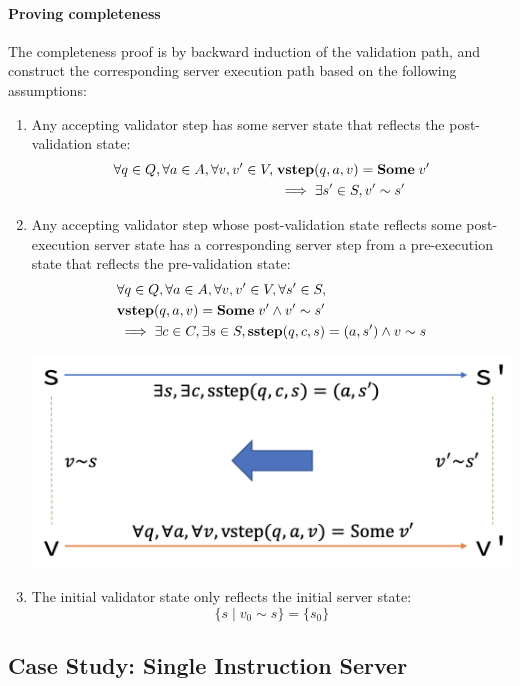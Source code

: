 \documentclass{article}
\theoremstyle{definition}
\newcommand{\sstep}{\ottkw{sstep}}
\newcommand{\vstep}{\ottkw{vstep}}
\newcommand{\Some}[1]{\ottkw{Some}\;#1}
\newcommand{\Reflects}[2]{#1\sim #2}
\begin{document}
\paragraph{Proving completeness}
The completeness proof is by backward induction of the validation path, and
construct the corresponding server execution path based on the following
assumptions:

\begin{enumerate}
\item Any accepting validator step has some server state that reflects the
  post-validation state:
  \begin{align*}
    \forall q\in Q,\forall a\in A,\forall v, v'\in V,\;&\vstep(q,a,v)=\Some{v'}\\
    &\implies\exists s'\in S,\Reflects{v'}{s'} 
  \end{align*}
\item Any accepting validator step whose post-validation state reflects some
  post-execution server state has a corresponding server step from a
  pre-execution state that reflects the pre-validation state:
  \begin{align*}
    &\forall q\in Q,\forall a\in A,\forall v,v'\in V,\forall s'\in S,\\
    &\vstep(q,a,v)=\Some{v'}\wedge\Reflects{v'}{s'}\\
    &\implies\exists c\in C,\exists s\in S,\sstep(q,c,s)=(a,s')\wedge\Reflects{v}{s}
  \end{align*}
  \begin{center}
    \includegraphics[width=.5\textwidth]{figures/completeness-preservation}
  \end{center}

\item The initial validator state only reflects the initial server state:
  \[\{s\mid\Reflects{v_0}{s}\}=\{s_0\}\]
\end{enumerate}

\subsection{Case Study: Single Instruction Server}
\label{sec:opserver}
\end{document}
